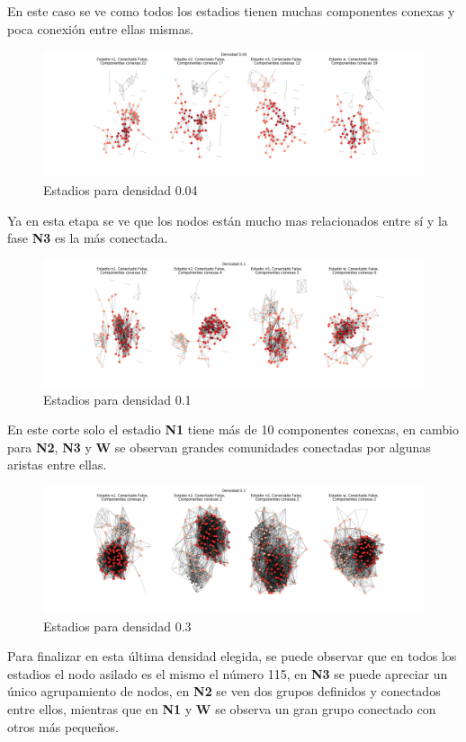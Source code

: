 En este caso se ve como todos los estadios tienen muchas componentes conexas y poca conexión entre ellas mismas.

\begin{figure}[H]
    \centering
    \includegraphics[width = \textwidth]{img/unweight_graphs_004.png}
    \caption{Estadios para densidad 0.04}
    \label{fig:unweight-004}
\end{figure}

Ya en esta etapa se ve que los nodos están mucho mas relacionados entre sí y la fase \textbf{N3} es la más conectada.
\begin{figure}[H]
    \centering
    \includegraphics[width = \textwidth]{img/unweight_graphs_01.png}
    \caption{Estadios para densidad 0.1}
    \label{fig:unweight-01}
\end{figure}

En este corte solo el estadio \textbf{N1} tiene más de 10 componentes conexas, en cambio para \textbf{N2}, \textbf{N3} y \textbf{W} se observan grandes comunidades conectadas por algunas aristas entre ellas.

\begin{figure}[H]
    \centering
    \includegraphics[width = \textwidth]{img/unweight_graphs_03.png}
    \caption{Estadios para densidad 0.3}
    \label{fig:unweight-03}
\end{figure}

Para finalizar en esta última densidad elegida, se puede observar que en todos los estadios el nodo asilado es el mismo el número 115, en \textbf{N3} se puede apreciar un único agrupamiento de nodos, en \textbf{N2} se ven dos grupos definidos y conectados entre ellos, mientras que en \textbf{N1} y \textbf{W} se observa un gran grupo conectado con otros más pequeños.